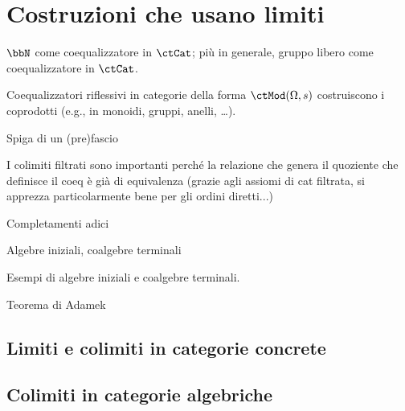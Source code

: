 \section{Costruzioni che usano limiti}
\begin{example}
	\(\bbN\) come coequalizzatore in \(\ctCat\); più in generale, gruppo libero come coequalizzatore in \(\ctCat\).
\end{example}
\begin{example}
	Coequalizzatori riflessivi in categorie della forma \(\ctMod(\Omega,s)\) costruiscono i coprodotti (e.g., in monoidi, gruppi, anelli, \dots).
\end{example}
\begin{proposition}
\end{proposition}
\begin{definition}
\end{definition}
\begin{example}
	Spiga di un (pre)fascio
\end{example}
\begin{remark}
	I colimiti filtrati sono importanti perché la relazione che genera il quoziente che definisce il coeq è già di equivalenza (grazie agli assiomi di cat filtrata, si apprezza particolarmente bene per gli ordini diretti...)
\end{remark}
\begin{example}
	Completamenti adici
\end{example}
\begin{example}
	Algebre iniziali, coalgebre terminali
\end{example}
\begin{examples}
	Esempi di algebre iniziali e coalgebre terminali.
\end{examples}
\begin{theorem}
	Teorema di Adamek
\end{theorem}
\subsection{Limiti e colimiti in categorie concrete}
\subsection{Colimiti in categorie algebriche}
\begin{esercizi}
	\item
	\item
	\item
	\item
	\item
\end{esercizi}

